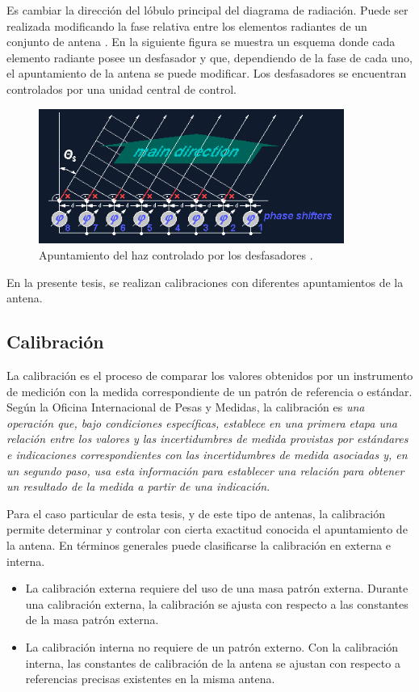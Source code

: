 Es cambiar la dirección del lóbulo principal del diagrama de radiación. Puede ser realizada modificando la fase relativa entre
los elementos radiantes de un conjunto de antena \cite{Standard1996}. En la siguiente figura se muestra un esquema donde cada 
elemento radiante posee un desfasador y que, dependiendo de la fase de cada uno, el apuntamiento de la antena se puede modificar.
Los desfasadores se encuentran controlados por una unidad central de control.

\begin{figure}[H]
 \centering
 \includegraphics[width=10cm]{gfx/beamSteering.png}
 \caption{Apuntamiento del haz controlado por los desfasadores \cite{BeamSteering}.}
\end{figure}

En la presente tesis, se realizan calibraciones con diferentes apuntamientos de la antena. 

\subsection{Calibración}

La calibración es el proceso de comparar los valores obtenidos por un instrumento de medición con la
medida correspondiente de un patrón de referencia o estándar. Según la Oficina Internacional de Pesas y Medidas, la 
calibración es \textit{una operación que, bajo condiciones específicas, establece en una primera etapa una relación entre
los valores y las incertidumbres de medida provistas por estándares e indicaciones correspondientes con las incertidumbres de 
medida asociadas y, en un segundo paso, usa esta información para establecer una relación para obtener un resultado de la 
medida a partir de una indicación}.

Para el caso particular de esta tesis, y de este tipo de antenas, la calibración permite determinar y controlar con cierta 
exactitud conocida el apuntamiento de la antena. En términos generales puede clasificarse la calibración en externa e interna. 
\begin{itemize}
	\item La calibración externa requiere del uso de una masa patrón externa. Durante una calibración externa, la calibración se
		ajusta con respecto a las constantes de la masa patrón externa. 
	\item La calibración interna no requiere de un patrón externo. Con la calibración interna, las constantes de calibración de
		la antena se ajustan con respecto a referencias precisas existentes en la misma antena.
\end{itemize}


